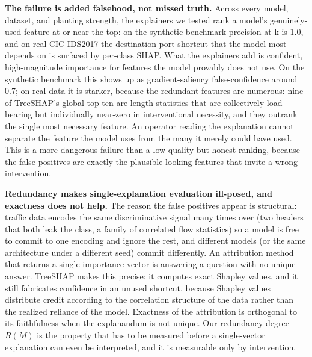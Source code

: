 \documentclass[journal]{IEEEtran}
\begin{document}
\textbf{The failure is added falsehood, not missed truth.} Across every
model, dataset, and planting strength, the explainers we tested rank a
model's genuinely-used feature at or near the top: on the synthetic
benchmark precision-at-k is 1.0, and on real CIC-IDS2017 the
destination-port shortcut that the model most depends on is surfaced by
per-class SHAP. What the explainers add is confident, high-magnitude
importance for features the model provably does not use. On the
synthetic benchmark this shows up as gradient-saliency false-confidence
around 0.7; on real data it is starker, because the redundant features
are numerous: nine of TreeSHAP's global top ten are length statistics
that are collectively load-bearing but individually near-zero in
interventional necessity, and they outrank the single most necessary
feature. An operator reading the explanation cannot separate the feature
the model uses from the many it merely could have used. This is a more
dangerous failure than a low-quality but honest ranking, because the
false positives are exactly the plausible-looking features that invite a
wrong intervention.

\textbf{Redundancy makes single-explanation evaluation ill-posed, and
exactness does not help.} The reason the false positives appear is
structural: traffic data encodes the same discriminative signal many
times over (two headers that both leak the class, a family of correlated
flow statistics) so a model is free to commit to one encoding and ignore
the rest, and different models (or the same architecture under a
different seed) commit differently. An attribution method that returns a
single importance vector is answering a question with no unique answer.
TreeSHAP makes this precise: it computes exact Shapley values, and it
still fabricates confidence in an unused shortcut, because Shapley
values distribute credit according to the correlation structure of the
data rather than the realized reliance of the model. Exactness of the
attribution is orthogonal to its faithfulness when the explanandum is
not unique. Our redundancy degree $R(M)$ is the property that has to be
measured before a single-vector explanation can even be interpreted, and
it is measurable only by intervention.
\end{document}
